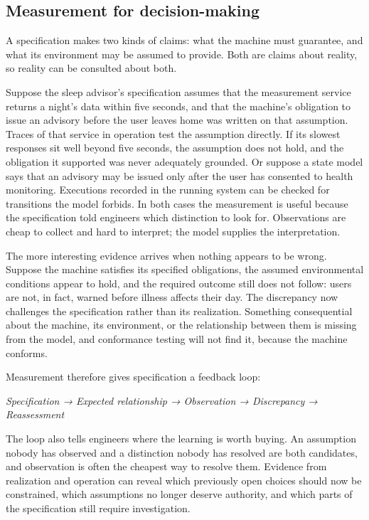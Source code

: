 \subsection{Measurement for decision-making}\label{sec-measurement-specification}

A specification makes two kinds of claims: what the machine must guarantee, and what its environment
may be assumed to provide. Both are claims about reality, so reality can be consulted about both.

Suppose the sleep advisor's specification assumes that the measurement service returns a night's data
within five seconds, and that the machine's obligation to issue an advisory before the user leaves
home was written on that assumption. Traces of that service in operation test the assumption
directly. If its slowest responses sit well beyond five seconds, the assumption does not hold, and
the obligation it supported was never adequately grounded. Or suppose a state model says that an
advisory may be issued only after the user has consented to health monitoring. Executions recorded in
the running system can be checked for transitions the model forbids. In both cases the measurement is
useful because the specification told engineers which distinction to look for. Observations are cheap
to collect and hard to interpret; the model supplies the interpretation.

The more interesting evidence arrives when nothing appears to be wrong. Suppose the machine satisfies
its specified obligations, the assumed environmental conditions appear to hold, and the required
outcome still does not follow: users are not, in fact, warned before illness affects their day. The
discrepancy now challenges the specification rather than its realization. Something consequential
about the machine, its environment, or the relationship between them is missing from the model, and
conformance testing will not find it, because the machine conforms.

Measurement therefore gives specification a feedback loop:

\emph{Specification → Expected relationship → Observation → Discrepancy → Reassessment}

The loop also tells engineers where the learning is worth buying. An assumption nobody has observed
and a distinction nobody has resolved are both candidates, and observation is often the cheapest way
to resolve them. Evidence from realization and operation can reveal which previously open choices
should now be constrained, which assumptions no longer deserve authority, and which parts of the
specification still require investigation.

